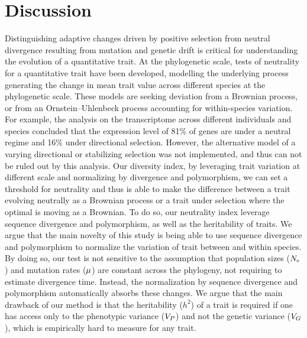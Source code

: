 \documentclass{article}
\begin{document}
\section{Discussion}\label{sec:discussion}
 Distinguishing adaptive changes driven by positive selection from neutral divergence resulting from mutation and genetic drift is critical for understanding the evolution of a quantitative trait.
At the phylogenetic scale, tests of neutrality for a quantitative trait have been developed, modelling the underlying process generating the change in mean trait value across different species at the phylogenetic scale\cite{fay_evaluating_2008}.
These models are seeking deviation from a Brownian process\cite{catalan_drift_2019}, or from an Ornstein–Uhlenbeck process accounting for within-species variation\cite{rohlfs_phylogenetic_2015}.
For example, the analysis on the transcriptome across different individuals and species concluded that the expression level of 81\% of genes are under a neutral regime and 16\% under directional selection\cite{catalan_drift_2019}.
However, the alternative model of a varying directional or stabilizing selection was not implemented, and thus can not be ruled out by this analysis.
Our diversity index, by leveraging trait variation at different scale and normalizing by divergence and polymorphism, we can set a threshold for neutrality and thus is able to make the difference between a trait evolving neutrally as a Brownian process or a trait under selection where the optimal is moving as a Brownian.
To do so, our neutrality index leverage sequence divergence and polymorphism, as well as the heritability of traits.
We argue that the main novelty of this study is being able to use sequence divergence and polymorphism to normalize the variation of trait between and within species.
By doing so, our test is not sensitive to the assumption that population sizes ($N_{\text{e}}$) and mutation rates ($\mu$) are constant across the phylogeny, not requiring to estimate divergence time\cite{litsios_effects_2012}.
Instead, the normalization by sequence divergence and polymorphism automatically absorbs these changes\cite{seo_estimating_2004}.
We argue that the main drawback of our method is that the heritability ($h^2$) of a trait is required if one has access only to the phenotypic variance ($V_{P}$) and not the genetic variance ($V_{G}$), which is empirically hard to measure for any trait.
\end{document}
